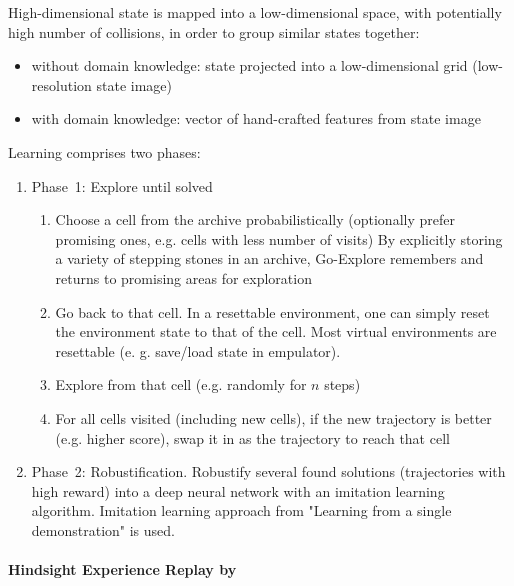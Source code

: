 \documentclass[acmsmall, nonacm]{acmart}
\begin{document}
High-dimensional state is mapped into a low-dimensional space, with potentially high number of collisions, in order to group similar states together:
\begin{itemize}
    \item without domain knowledge: state projected into a low-dimensional grid (low-resolution state image)
    \item with domain knowledge: vector of hand-crafted features from state image
\end{itemize}

Learning comprises two phases:
\begin{enumerate}
    \item Phase~1: Explore until solved
    \begin{enumerate}
      \item Choose a cell from the archive probabilistically (optionally prefer promising ones, e.g. cells with less number of visits)
    By explicitly storing a variety of stepping stones in an archive, Go-Explore remembers and returns to promising areas for exploration
      \item Go back to that cell. In a resettable environment, one can simply reset the environment state to that of the cell. Most virtual environments are resettable (e. g. save/load state in empulator).
      \item Explore from that cell (e.g. randomly for $n$ steps)
      \item For all cells visited (including new cells), if the new trajectory is better (e.g. higher score), swap it in as the trajectory to reach that cell
    \end{enumerate}

    \item Phase~2: Robustification. Robustify several found solutions (trajectories with high reward) into a deep neural network with an imitation learning algorithm. Imitation learning approach from "Learning from a single demonstration" is used.
\end{enumerate}


\paragraph{Hindsight Experience Replay by~\citet{andrychowicz_hindsight_2017}} %
\label{par:hindsight}
\end{document}
